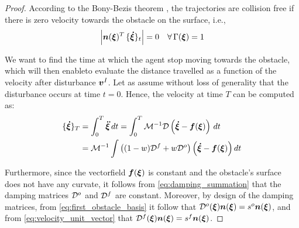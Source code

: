 \begin{proof}
According to the Bony-Bezis theorem \parencite{bony1969principe}, the trajectories are collision free if there is zero velocity towards the obstacle on the surface, i.e.,
\begin{equation}
	\left| \vect n(\vecs \xi)^T \, \{ \vecs{\dot \xi} \}_{t} \right| = 0 
	\quad \forall \, \Gamma(\vecs \xi) = 1
	\label{eq:bezis_theorem}
\end{equation}

We want to find the time at which the agent stop moving towards the obstacle, which will then enableto evaluate the distance travelled as a function of the velocity after disturbance $\boldsymbol{v}^I$. 
Let as assume without loss of generality that the disturbance occurs at time $t=0$. Hence, the velocity at time $T$ can be computed as:
\begin{equation}
\begin{split}
	\{ \vecs{\dot \xi} \}_{T} 
	& = \int_0^T \vecs{\ddot \xi} \, dt = \int_0^T \matd{M}^{-1} \matd{D} \left( \vecs{\dot \xi} - \vect f(\vecs \xi ) \right) \, dt \\
	& = \matd{M}^{-1} \int \left( (1 - w) \matd{D}^f + w \matd{D}^{o} \right) \left( \vecs{\dot \xi} - \vect f (\vecs \xi ) \right) dt \\
	\end{split}
\label{eq:velocity_evolution}
\end{equation}

Furthermore, since the vectorfield $\boldsymbol{f}(\boldsymbol{\xi})$ is constant and the obstacle's surface does not have any curvate, it follows from \eqref{eq:damping_summation} that the damping matrices  $\mathcal{D}^o$ and $\mathcal{D}^f$ are constant.
Moreover, by design of the damping matrices, from \eqref{eq:first_obstacle_basis} it follow that $\mathcal{D}^o(\boldsymbol{\xi}) \boldsymbol{n}(\boldsymbol{\xi}) = s^o \boldsymbol{n}(\boldsymbol{\xi})$, and from  \eqref{eq:velocity_unit_vector} that $\mathcal{D}^f(\boldsymbol{\xi}) \boldsymbol{n}(\boldsymbol{\xi}) = s^f \boldsymbol{n}(\boldsymbol{\xi})$. 


\end{proof}
